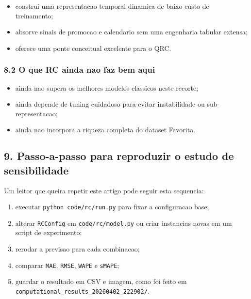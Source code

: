 \documentclass[12pt]{article}
\providecommand{\tightlist}{%
          \setlength{\itemsep}{0pt}\setlength{\parskip}{0pt}}
\begin{document}
\begin{itemize}
\tightlist
\item
  construi uma representacao temporal dinamica de baixo custo de treinamento;
\item
  absorve sinais de promocao e calendario sem uma engenharia tabular extensa;
\item
  oferece uma ponte conceitual excelente para o QRC.
\end{itemize}

\subsubsection{8.2 O que RC ainda nao faz bem aqui}\label{82-o-que-rc-ainda-nao-faz-bem-aqui}

\begin{itemize}
\tightlist
\item
  ainda nao supera os melhores modelos classicos neste recorte;
\item
  ainda depende de tuning cuidadoso para evitar instabilidade ou sub-representacao;
\item
  ainda nao incorpora a riqueza completa do dataset Favorita.
\end{itemize}

\subsection{9. Passo-a-passo para reproduzir o estudo de sensibilidade}\label{9-passo-a-passo-para-reproduzir-o-estudo-de-sensibilidade}

Um leitor que queira repetir este artigo pode seguir esta sequencia:

\begin{enumerate}
\def\labelenumi{\arabic{enumi}.}
\tightlist
\item
  executar \texttt{python\ code/rc/run.py} para fixar a configuracao base;
\item
  alterar \texttt{RCConfig} em \texttt{code/rc/model.py} ou criar instancias novas em um script de experimento;
\item
  rerodar a previsao para cada combinacao;
\item
  comparar \texttt{MAE}, \texttt{RMSE}, \texttt{WAPE} e \texttt{sMAPE};
\item
  guardar o resultado em CSV e imagem, como foi feito em \texttt{computational\_results\_20260402\_222902/}.
\end{enumerate}
\end{document}
